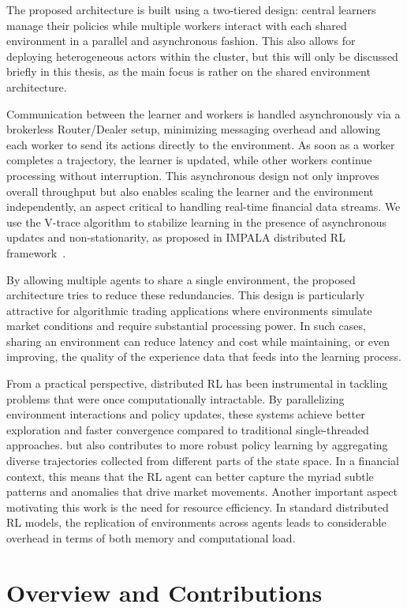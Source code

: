 The proposed architecture is built using a two-tiered design: central learners manage their policies while multiple workers interact with each shared environment
in a parallel and asynchronous fashion.
This also allows for deploying heterogeneous actors within the cluster, but this will only be discussed briefly in this thesis,
as the main focus is rather on the shared environment architecture.

Communication between the learner and workers is handled asynchronously via a brokerless Router/Dealer setup,
minimizing messaging overhead and allowing each worker to send its actions directly to the environment.
As soon as a worker completes a trajectory, the learner is updated, while other workers continue processing without interruption.
This asynchronous design not only improves overall throughput but also enables scaling the learner and the environment independently,
an aspect critical to handling real-time financial data streams.
We use the V-trace algorithm to stabilize learning in the presence of asynchronous updates and non-stationarity,
as proposed in IMPALA distributed RL framework~\cite{WOS:000970111200001}.

By allowing multiple agents to share a single environment, the proposed architecture tries to reduce these redundancies.
This design is particularly attractive for algorithmic trading applications where environments
simulate market conditions and require substantial processing power.
In such cases, sharing an environment can reduce latency and cost while maintaining, or even improving,
the quality of the experience data that feeds into the learning process.

From a practical perspective, distributed RL has been instrumental in tackling problems that were once computationally intractable.
By parallelizing environment interactions and policy updates, these systems achieve better exploration
and faster convergence compared to traditional single-threaded approaches.
but also contributes to more robust policy learning by aggregating diverse trajectories collected from different parts of the state space.
In a financial context, this means that the RL agent can better capture the myriad subtle patterns and anomalies that drive market movements.
Another important aspect motivating this work is the need for resource efficiency.
In standard distributed RL models, the replication of environments across agents leads to considerable overhead in terms of both memory and computational load.

\section{Overview and Contributions}
\label{sec:overview}

